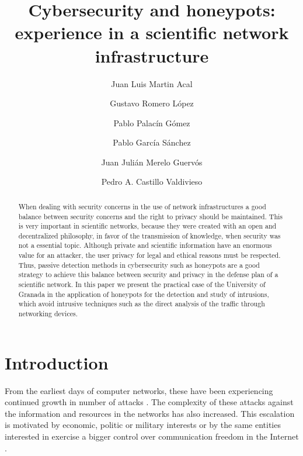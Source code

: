 \documentclass[a4paper]{llncs}
\begin{document}
	\pagestyle{empty}

	\mainmatter

	\title{Cybersecurity and honeypots: experience in a scientific network infrastructure} 


	\author{Juan Luis Martin Acal \and Gustavo Romero López \and Pablo Palacín Gómez \and Pablo García Sánchez \and Juan Julián Merelo Guervós \and Pedro A. Castillo Valdivieso }



	\maketitle

\begin{abstract}
When dealing with security concerns in the use of network infrastructures a good balance between security concerns and the right to privacy should be maintained. This is very important in scientific networks, because they were created with an open and decentralized philosophy, in favor of the transmission of knowledge, when security was not a essential topic.
Although private and scientific information have an enormous value for an attacker, the user privacy for legal and ethical reasons must be respected. Thus, passive detection methods in cybersecurity such as honeypots are a good strategy to achieve this balance between security and privacy in the defense plan of a scientific network. In this paper we present the practical case of the University of Granada in the application of honeypots for the detection and study of intrusions, which avoid intrusive techniques such as the direct analysis of the traffic through networking devices.
\end{abstract}


\section{Introduction}
From the earliest days of computer networks, these have been experiencing continued growth in number of attacks \cite{esset-tendencias,cni-ccn-tendencias-2014,cni-ccn-tendencias-2015}. The complexity of these attacks against the information and resources in the networks has also increased. This escalation is motivated by economic, politic or military interests or by the same entities interested in exercise a bigger control over communication freedom in the Internet \cite{cni-ccn-tendencias-2015,cisco-2014}.
\end{document}
